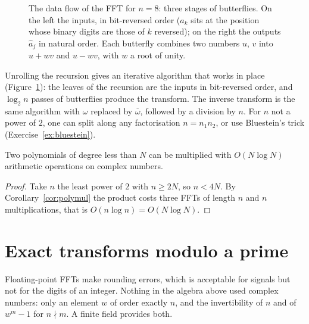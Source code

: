 \begin{figure}[ht]
\centering
{}
\caption{The data flow of the FFT for $n=8$: three stages of butterflies. On the left the inputs, in bit-reversed order
($a_k$ sits at the position whose binary digits are those of $k$ reversed); on the right the outputs $\hat a_j$ in natural
order. Each butterfly combines two numbers $u$, $v$ into $u+wv$ and $u-wv$, with $w$ a root of unity.}
\label{fig:butterfly}
\end{figure}

Unrolling the recursion gives an iterative algorithm that works in place (Figure~\ref{fig:butterfly}): the leaves of the
recursion are the inputs in bit-reversed order, and $\log_2n$ passes of butterflies produce the transform. The inverse
transform is the same algorithm with $\omega$ replaced by $\overline\omega$, followed by a division by $n$. For $n$ not a power of $2$,
one can split along any factorisation $n=n_1n_2$, or use Bluestein's trick (Exercise~\ref{ex:bluestein}).

\begin{corollary}\label{cor:fastmul}
Two polynomials of degree less than $N$ can be multiplied with $O(N\log N)$ arithmetic operations on complex numbers.
\end{corollary}
\begin{proof}
Take $n$ the least power of $2$ with $n\ge2N$, so $n<4N$. By Corollary~\ref{cor:polymul} the product costs three FFTs of length $n$ and $n$
multiplications, that is $O(n\log n)=O(N\log N)$.
\end{proof}

\section{Exact transforms modulo a prime}

Floating-point FFTs make rounding errors, which is acceptable for signals but not for the digits of an integer. Nothing in
the algebra above used complex numbers: only an element $w$ of order exactly $n$, and the invertibility of $n$ and of $w^m-1$ for
$n\nmid m$. A finite field provides both.

